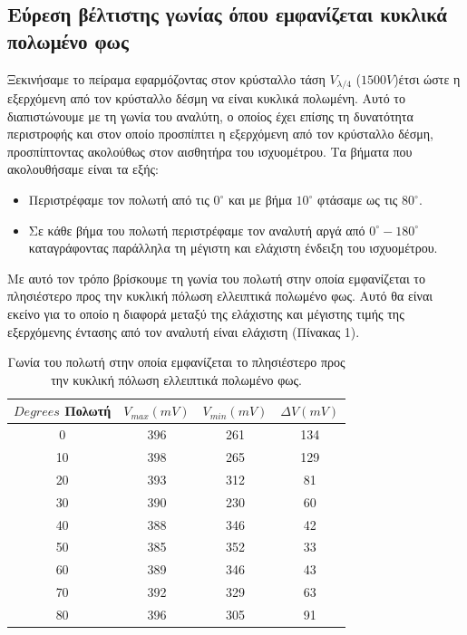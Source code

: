 \documentclass[a4paper,11pt,titlepage]{article}
\newcommand{\degrees}{^{\circ}}
\begin{document}
\subsection{Εύρεση βέλτιστης γωνίας όπου εμφανίζεται κυκλικά πολωμένο φως}
Ξεκινήσαμε το πείραμα εφαρμόζοντας στον κρύσταλλο τάση $V_{\lambda /4}$ ($1500 V$)έτσι ώστε η εξερχόμενη από τον κρύσταλλο δέσμη να είναι κυκλικά πολωμένη. Αυτό το διαπιστώνουμε με τη γωνία του αναλύτη, ο οποίος έχει επίσης τη δυνατότητα περιστροφής και στον οποίο προσπίπτει η εξερχόμενη από τον κρύσταλλο δέσμη, προσπίπτοντας ακολούθως στον αισθητήρα του ισχυομέτρου. 
Τα βήματα που ακολουθήσαμε είναι τα εξής:
\begin{itemize}
\item Περιστρέφαμε τον πολωτή από τις $0\degrees$  και με βήμα $10\degrees$ φτάσαμε ως τις $80\degrees$.
\item Σε κάθε βήμα του πολωτή περιστρέφαμε τον αναλυτή αργά από $0\degrees - 180\degrees$ καταγράφοντας παράλληλα τη μέγιστη και ελάχιστη ένδειξη του ισχυομέτρου.
\end{itemize}
Με αυτό τον τρόπο βρίσκουμε τη γωνία του πολωτή στην οποία εμφανίζεται το πλησιέστερο προς την κυκλική πόλωση ελλειπτικά πολωμένο φως. Αυτό θα είναι εκείνο για το οποίο η διαφορά μεταξύ της ελάχιστης και μέγιστης τιμής της εξερχόμενης έντασης από τον αναλυτή είναι ελάχιστη (Πίνακας 1).

\begin{table} [H]
\centering
\begin{tabular}{|c|c|c|c|}
\hline \rule[-2ex]{0pt}{5.5ex} $Degrees$ Πολωτή & $V_{max} (mV)$ & $V_{min} (mV)$ & $\Delta V (mV)$ \\ 
\hline \rule[-2ex]{0pt}{5.5ex} 0 & 396 & 261 & 134 \\
\hline \rule[-2ex]{0pt}{5.5ex} 10 & 398 & 265 & 129 \\
\hline \rule[-2ex]{0pt}{5.5ex} 20 & 393 & 312 & 81 \\
\hline \rule[-2ex]{0pt}{5.5ex} 30 & 390 & 230 & 60 \\
\hline \rule[-2ex]{0pt}{5.5ex} 40 & 388 & 346 & 42 \\
\hline \rule[-2ex]{0pt}{5.5ex} 50 & 385 & 352 & 33 \\
\hline \rule[-2ex]{0pt}{5.5ex} 60 & 389 & 346 & 43 \\
\hline \rule[-2ex]{0pt}{5.5ex} 70 & 392 & 329 & 63\\
\hline \rule[-2ex]{0pt}{5.5ex} 80 & 396 & 305 & 91 \\
\hline 
\end{tabular} 
\caption{Γωνία του πολωτή στην οποία εμφανίζεται το πλησιέστερο προς την κυκλική πόλωση ελλειπτικά πολωμένο φως.}
\end{table}
\end{document}
